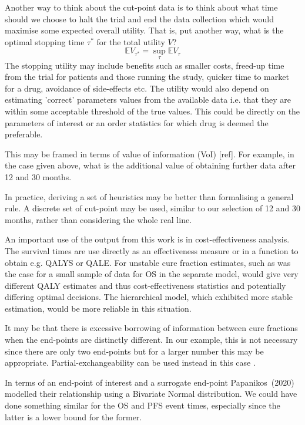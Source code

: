 \documentclass[AMA,STIX1COL]{WileyNJD-v2}
\begin{document}
Another way to think about the cut-point data is to think about what time should we choose to halt the trial and end the data collection which would maximise some expected overall utility.
That is, put another way, what is the optimal stopping time $\tau^*$ for the total utility $V$?
$$
\mathbb{E} V_{\tau^*} = \sup_{\tau} \mathbb{E} V_{\tau}
$$
The stopping utility may include benefits such as smaller costs, freed-up time from the trial for patients and those running the study, quicker time to market for a drug, avoidance of side-effects etc.
The utility would also depend on estimating 'correct' parameters values from the available data i.e. that they are within some acceptable threshold of the true values.
This could be directly on the parameters of interest or an order statistics for which drug is deemed the preferable.

This may be framed in terms of value of information (VoI) [ref].
For example, in the case given above, what is the additional value of obtaining further data after 12 and 30 months.

In practice, deriving a set of heuristics may be better than formalising a general rule.
A discrete set of cut-point may be used, similar to our selection of 12 and 30 months, rather than considering the whole real line.

An important use of the output from this work is in cost-effectiveness analysis.
The survival times are use directly as an effectiveness measure or in a function to obtain e.g. QALYS or QALE. For unstable cure fraction estimates, such as was the case for a small sample of data for OS in the separate model, would give very different QALY estimates and thus cost-effectiveness statistics and potentially differing optimal decisions.
The hierarchical model, which exhibited more stable estimation, would be more reliable in this situation.


It may be that there is excessive borrowing of information between cure fractions when the end-points are distinctly different.
In our example, this is not necessary since there are only two end-points but for a larger number this may be appropriate.
Partial-exchangeability can be used instead in this case \cite{Neuenschwander2016}.

In terms of an end-point of interest and a surrogate end-point Papanikos~(2020) \cite{Papanikos2020} modelled their relationship using a Bivariate Normal distribution.
We could have done something similar for the OS and PFS event times, especially since the latter is a lower bound for the former.
\end{document}
